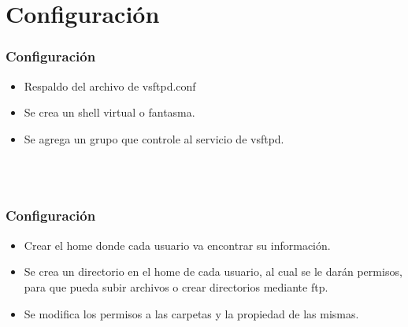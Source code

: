 \section{Configuraci\'on}

  \begin{frame}
    \frametitle{Configuraci\'on}
    \begin{itemize}
      \item Respaldo del archivo de vsftpd.conf
      \item Se crea un shell virtual o fantasma.
      \item Se agrega un grupo que controle al servicio de vsftpd.
    \end{itemize}
    \begin{shell}
      \\
      \\
    \hline\end{shell}
  \end{frame}

  \begin{frame}
    \frametitle{Configuraci\'on}
    \begin{itemize}
      \item Crear el home donde cada usuario va encontrar su informaci\'on.
      \item Se crea un directorio en el home de cada usuario, al cual se le dar\'an permisos, para 
      que pueda subir archivos o crear directorios mediante ftp.
      \item Se modifica los permisos a las carpetas y la propiedad de las mismas.
    \end{itemize}
    
    \begin{shell}
      \\
    \hline\end{shell}
  \end{frame}

